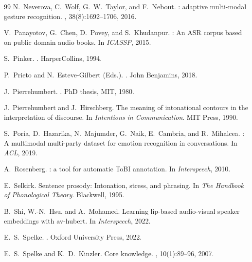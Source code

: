 \documentclass[11pt,letterpaper]{article}
\begin{document}
\begin{thebibliography}{99}
N.~Neverova, C.~Wolf, G.~W.\ Taylor, and F.~Nebout.
: adaptive multi-modal gesture recognition.
, 38(8):1692--1706, 2016.

V.~Panayotov, G.~Chen, D.~Povey, and S.~Khudanpur.
: An {ASR} corpus based on public domain audio books.
\newblock In {\em ICASSP}, 2015.

S.~Pinker.
.
\newblock HarperCollins, 1994.

P.~Prieto and N.~Esteve-Gilbert (Eds.).
.
\newblock John Benjamins, 2018.

J.~Pierrehumbert.
.
\newblock PhD thesis, MIT, 1980.

J.~Pierrehumbert and J.~Hirschberg.
\newblock The meaning of intonational contours in the interpretation of discourse.
\newblock In {\em Intentions in Communication}. MIT Press, 1990.

S.~Poria, D.~Hazarika, N.~Majumder, G.~Naik, E.~Cambria, and R.~Mihalcea.
: A multimodal multi-party dataset for emotion recognition in conversations.
\newblock In {\em ACL}, 2019.

A.~Rosenberg.
: a tool for automatic {ToBI} annotation.
\newblock In {\em Interspeech}, 2010.

E.~Selkirk.
\newblock Sentence prosody: Intonation, stress, and phrasing.
\newblock In {\em The Handbook of Phonological Theory}. Blackwell, 1995.

B.~Shi, W.-N.\ Hsu, and A.~Mohamed.
\newblock Learning lip-based audio-visual speaker embeddings with av-hubert.
\newblock In {\em Interspeech}, 2022.

E.~S.\ Spelke.
.
\newblock Oxford University Press, 2022.

E.~S.\ Spelke and K.~D.\ Kinzler.
\newblock Core knowledge.
, 10(1):89--96, 2007.


\end{thebibliography}
\end{document}
